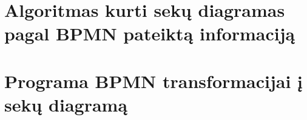 \documentclass{VUMIFInfBakalaurinis}
\begin{document}
\section{Algoritmas kurti sekų diagramas pagal BPMN pateiktą informaciją}
\section{Programa BPMN transformacijai į sekų diagramą}   





\printbibliography[heading=bibintoc] %


\appendix  %




\end{document}
